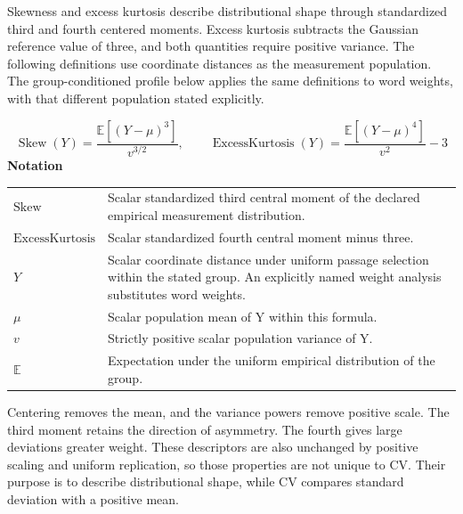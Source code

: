 \documentclass[10pt,letterpaper]{article}
\newcommand{\notlabel}{\noindent\textbf{Notation}\par\nobreak\vspace{4pt}}
\begin{document}
Skewness and excess kurtosis describe distributional shape through standardized third and fourth centered moments. Excess kurtosis subtracts the Gaussian reference value of three, and both quantities require positive variance. The following definitions use coordinate distances as the measurement population. The group-conditioned profile below applies the same definitions to word weights, with that different population stated explicitly.\par

\par\noindent\begin{minipage}{\linewidth}
\begin{equation}\label{eq:highermoments}
\operatorname{Skew}(Y)=\frac{\mathbb E[(Y-\mu)^3]}{v^{3/2}},\qquad\operatorname{ExcessKurtosis}(Y)=\frac{\mathbb E[(Y-\mu)^4]}{v^2}-3
\end{equation}
\notlabel
{\fontsize{8.5}{10.5}\selectfont\setlength{\tabcolsep}{0pt}\renewcommand{\arraystretch}{1.12}
\begin{tabularx}{\linewidth}{@{}p{.14\linewidth}X@{}}
$\mathrm{Skew}$ & Scalar standardized third central moment of the declared empirical measurement distribution.\\
$\mathrm{ExcessKurtosis}$ & Scalar standardized fourth central moment minus three.\\
$Y$ & Scalar coordinate distance under uniform passage selection within the stated group. An explicitly named weight analysis substitutes word weights.\\
$\mu$ & Scalar population mean of Y within this formula.\\
$v$ & Strictly positive scalar population variance of Y.\\
$\mathbb E$ & Expectation under the uniform empirical distribution of the group.\\
\end{tabularx}}
\par\vspace{2pt}
\end{minipage}\par
Centering removes the mean, and the variance powers remove positive scale. The third moment retains the direction of asymmetry. The fourth gives large deviations greater weight. These descriptors are also unchanged by positive scaling and uniform replication, so those properties are not unique to CV. Their purpose is to describe distributional shape, while CV compares standard deviation with a positive mean.\par
\end{document}
